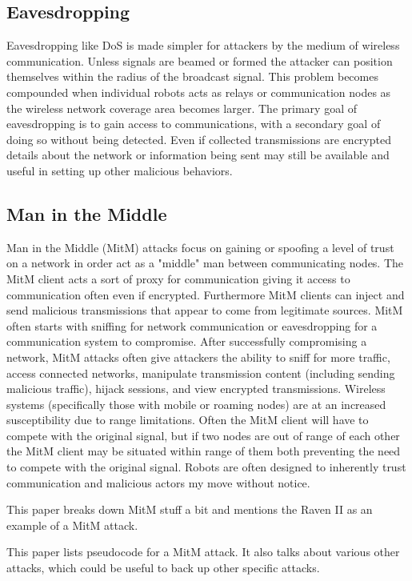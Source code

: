 \subsection{Eavesdropping}
Eavesdropping like DoS is made simpler for attackers by the medium of wireless communication.  Unless signals are beamed or formed the attacker can position themselves within the radius of the broadcast signal. This problem becomes compounded when individual robots acts as relays or communication nodes as the wireless network coverage area becomes larger.  The primary goal of eavesdropping is to gain access to communications, with a secondary goal of doing so without being detected.  Even if collected transmissions are encrypted details about the network or information being sent may still be available and useful in setting up other malicious behaviors.  

\subsection{Man in the Middle}
Man in the Middle (MitM) attacks focus on gaining or spoofing a level of trust on a network in order act as a "middle" man between communicating nodes. The MitM client acts a sort of proxy for communication giving it access to communication often even if encrypted.  Furthermore MitM clients can inject and send malicious transmissions that appear to come from legitimate sources.  MitM often starts with sniffing for network communication or eavesdropping for a communication system to compromise.  After successfully compromising a network, MitM attacks often give attackers the ability to sniff for more traffic, access connected networks, manipulate transmission content (including sending malicious traffic), hijack sessions, and view encrypted transmissions.  Wireless systems (specifically those with mobile or roaming nodes) are at an increased susceptibility due to range limitations.  Often the MitM client will have to compete with the original signal, but if two nodes are out of range of each other the MitM client may be situated within range of them both preventing the need to compete with the original signal. Robots are often designed to inherently trust communication and malicious actors my move without notice. 

This paper\cite{Bonaci2012} breaks down MitM stuff a bit and mentions the Raven II as an example of a MitM attack.

This paper \cite{Yousef2018AnalyzingCT} lists pseudocode for a MitM attack. It also talks about various other attacks, which could be useful to back up other specific attacks.

